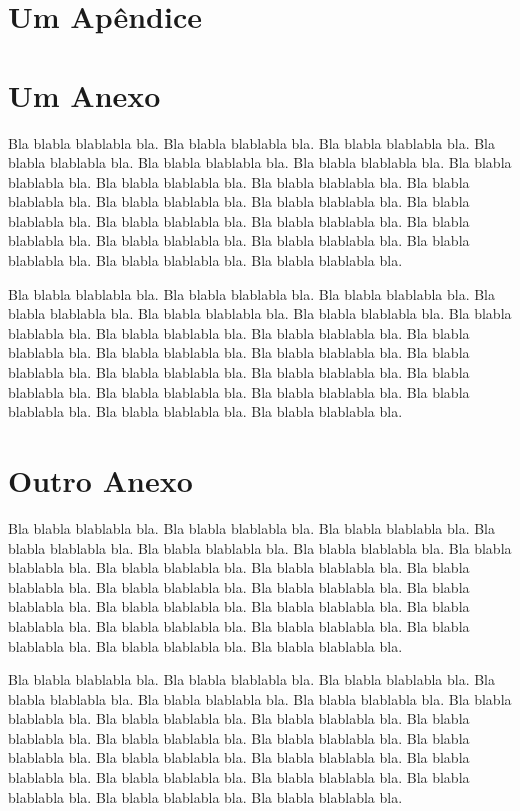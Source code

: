 \documentclass[tcc,capa]{texufpel}
\begin{document}
\apendices
\chapter{Um Apêndice}

\anexos
\chapter{Um Anexo}

Bla blabla blablabla bla.  Bla blabla blablabla bla.  Bla blabla
blablabla bla.  Bla blabla blablabla bla.  Bla blabla blablabla bla.
Bla blabla blablabla bla.  Bla blabla blablabla bla.  Bla blabla
blablabla bla.  Bla blabla blablabla bla.  Bla blabla blablabla bla.
Bla blabla blablabla bla.  Bla blabla blablabla bla.  Bla blabla
blablabla bla.  Bla blabla blablabla bla.  Bla blabla blablabla bla.
Bla blabla blablabla bla.  Bla blabla blablabla bla.  Bla blabla
blablabla bla.  Bla blabla blablabla bla.  Bla blabla blablabla bla.
Bla blabla blablabla bla.

Bla blabla blablabla bla.  Bla blabla blablabla bla.  Bla blabla
blablabla bla.  Bla blabla blablabla bla.  Bla blabla blablabla bla.
Bla blabla blablabla bla.  Bla blabla blablabla bla.  Bla blabla
blablabla bla.  Bla blabla blablabla bla.  Bla blabla blablabla bla.
Bla blabla blablabla bla.  Bla blabla blablabla bla.  Bla blabla
blablabla bla.  Bla blabla blablabla bla.  Bla blabla blablabla bla.
Bla blabla blablabla bla.  Bla blabla blablabla bla.  Bla blabla
blablabla bla.  Bla blabla blablabla bla.  Bla blabla blablabla bla.
Bla blabla blablabla bla.

\chapter{Outro Anexo}

Bla blabla blablabla bla.  Bla blabla blablabla bla.  Bla blabla
blablabla bla.  Bla blabla blablabla bla.  Bla blabla blablabla bla.
Bla blabla blablabla bla.  Bla blabla blablabla bla.  Bla blabla
blablabla bla.  Bla blabla blablabla bla.  Bla blabla blablabla bla.
Bla blabla blablabla bla.  Bla blabla blablabla bla.  Bla blabla
blablabla bla.  Bla blabla blablabla bla.  Bla blabla blablabla bla.
Bla blabla blablabla bla.  Bla blabla blablabla bla.  Bla blabla
blablabla bla.  Bla blabla blablabla bla.  Bla blabla blablabla bla.
Bla blabla blablabla bla.

Bla blabla blablabla bla.  Bla blabla blablabla bla.  Bla blabla
blablabla bla.  Bla blabla blablabla bla.  Bla blabla blablabla bla.
Bla blabla blablabla bla.  Bla blabla blablabla bla.  Bla blabla
blablabla bla.  Bla blabla blablabla bla.  Bla blabla blablabla bla.
Bla blabla blablabla bla.  Bla blabla blablabla bla.  Bla blabla
blablabla bla.  Bla blabla blablabla bla.  Bla blabla blablabla bla.
Bla blabla blablabla bla.  Bla blabla blablabla bla.  Bla blabla
blablabla bla.  Bla blabla blablabla bla.  Bla blabla blablabla bla.
Bla blabla blablabla bla.
\end{document}
